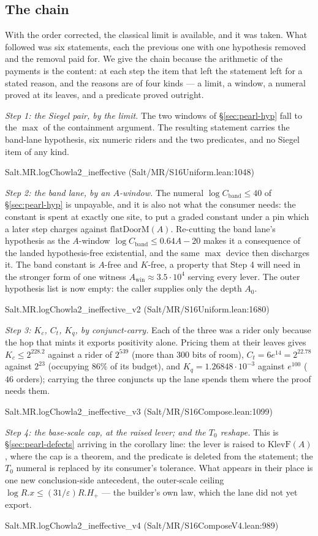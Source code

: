 \documentclass[11pt]{amsart}
\newcommand{\leanname}[1]{\par{\noindent\small\ttfamily\raggedright #1\par}}
\theoremstyle{remark}
\begin{document}
\subsection{The chain}\label{sec:chain}
With the order corrected, the classical limit is available, and it was taken.
What followed was six statements, each the previous one with one hypothesis
removed and the removal paid for. We give the chain because the arithmetic of
the payments is the content: at each step the item that left the statement left
for a stated reason, and the reasons are of four kinds --- a limit, a window, a
numeral proved at its leaves, and a predicate proved outright.

\emph{Step 1: the Siegel pair, by the limit.} The two windows of
\S\ref{sec:pearl-hyp} fall to the $\max$ of the containment argument. The
resulting statement carries the band-lane hypothesis, six numeric riders and
the two predicates, and no Siegel item of any kind.
\leanname{Salt.MR.logChowla2\_ineffective (Salt/MR/S16Uniform.lean:1048)}

\emph{Step 2: the band lane, by an $A$-window.} The numeral
$\log C_{\mathrm{band}} \le 40$ of \S\ref{sec:pearl-hyp} is unpayable, and it
is also not what the consumer needs: the constant is spent at exactly one site,
to put a graded constant under a pin which a later step charges against
$\mathrm{flatDoorM}(A)$. Re-cutting the band lane's hypothesis as the
$A$-window $\log C_{\mathrm{band}} \le 0.64A - 20$ makes it a consequence of
the landed hypothesis-free existential, and the same $\max$ device then
discharges it. The band constant is $A$-free and $K$-free, a property that
Step 4 will need in the stronger form of one witness
$A_{\mathrm{win}} \approx 3.5\cdot10^{4}$ serving every lever. The outer
hypothesis list is now empty: the caller supplies only the depth $A_0$.
\leanname{Salt.MR.logChowla2\_ineffective\_v2 (Salt/MR/S16Uniform.lean:1680)}

\emph{Step 3: $K_c$, $C_t$, $K_q$, by conjunct-carry.} Each of the three was a
rider only because the hop that mints it exports positivity alone. Pricing them
at their leaves gives $K_c \le 2^{228.2}$ against a rider of $2^{539}$ (more
than $300$ bits of room), $C_t = 6e^{14} = 2^{22.78}$ against $2^{23}$
(occupying $86\%$ of its budget), and $K_q = 1.26848\cdot10^{-3}$ against
$e^{100}$ ($46$ orders); carrying the three conjuncts up the lane spends them
where the proof needs them.
\leanname{Salt.MR.logChowla2\_ineffective\_v3 (Salt/MR/S16Compose.lean:1099)}

\emph{Step 4: the base-scale cap, at the raised lever; and the $T_0$ reshape.}
This is \S\ref{sec:pearl-defects} arriving in the corollary line: the lever is
raised to $\mathrm{KlevF}(A)$, where the cap is a theorem, and the predicate is
deleted from the statement; the $T_0$ numeral is replaced by its consumer's
tolerance. What appears in their place is one new conclusion-side antecedent,
the outer-scale ceiling $\log R.x \le (31/\varepsilon)R.H_+$ --- the builder's
own law, which the lane did not yet export.
\leanname{Salt.MR.logChowla2\_ineffective\_v4 (Salt/MR/S16ComposeV4.lean:989)}
\end{document}
